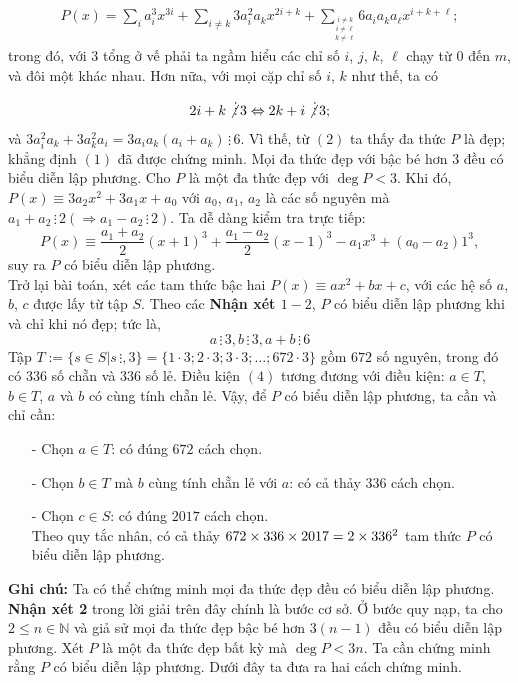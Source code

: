 \begin{bt}
{	\begin{align*}
	P(x)=\sum\limits_{i}a_{i}^{3}x^{3i}+\sum\limits_{i\neq k}3a_{i}^{2}a_{k}x^{2i+k}+\sum\limits_{\overset{i\neq k}{\overset{i\neq \ell}{\overset{k\neq \ell}{}}}}6a_{i}a_{k}a_{\ell}x^{i+k+\ell}; \tag{2}
	\end{align*} 
	trong đó, với $3$ tổng ở vế phải ta ngầm hiểu các chỉ số $i$, $j$, $k$, $\ell$ chạy từ $0$ đến $m$, và đôi một khác nhau. Hơn nữa, với mọi cặp chỉ số $i$, $k$ như thế, ta có 
	\begin{align*}
	2i+k\not\vdots\,3 \Leftrightarrow 2k+i\not\vdots\,3;
	\end{align*} và $3a_{i}^{2}a_{k}+3a_{k}^{2}a_{i}=3a_{i}a_{k}(a_{i}+a_{k})\,\vdots\,6$. Vì thế, từ $(2)$ ta thấy đa thức $P$ là đẹp; khẳng định $(1)$ đã được chứng minh.
	\nx Mọi đa thức đẹp với bậc bé hơn $3$ đều có biểu diễn lập phương.
	\cm Cho $P$ là một đa thức đẹp với $\deg P<3$. Khi đó, $P(x)\equiv 3a_{2}x^{2}+3a_{1}x+a_{0}$ với $a_{0}$, $a_{1}$, $a_{2}$ là các số nguyên mà $a_{1}+a_{2}\,\vdots\,2 (\Rightarrow a_{1}-a_{2}\,\vdots\,2)$. Ta dễ dàng kiểm tra trực tiếp:
		\[P(x)\equiv\dfrac{a_{1}+a_{2}}{2}(x+1)^{3}+\dfrac{a_{1}-a_{2}}{2}(x-1)^{3}-a_{1}x^{3}+(a_{0}-a_{2})1^{3},\tag{3}\] suy ra $P$ có biểu diễn lập phương.\\
	Trở lại bài toán, xét các tam thức bậc hai $P(x)\equiv ax^{2}+bx+c$, với các hệ số $a$, $b$, $c$ được lấy từ tập $S$. Theo các \textbf{Nhận xét $1-2$}, $P$ có biểu diễn lập phương khi và chỉ khi nó đẹp; tức là, 
	\[a\,\vdots\,3, b\,\vdots\,3, a+b \,\vdots\,6 \tag{4}\] 
	Tập $T:=\{s\in S|s\,\vdots,3\}=\{1\cdot3; 2\cdot3; 3\cdot3;\ldots;672\cdot3\}$ gồm $672$ số nguyên, trong đó có $336$ số chẵn và $336$ số lẻ. Điều kiện $(4)$ tương đương với điều kiện: $a\in T$, $b\in T$, $a$ và $b$ có cùng tính chẵn lẻ. Vậy, để $P$ có biểu diễn lập phương, ta cần và chỉ cần: 
	\begin{itemize} 
		\item[-] Chọn $a\in T$: có đúng $672$ cách chọn.
		\item[-] Chọn $b\in T$ mà $b$ cùng tính chẵn lẻ với $a$: có cả thảy $336$ cách chọn.
		\item[-] Chọn $c\in S$: có đúng $2017$ cách chọn.\\
		Theo quy tắc nhân, có cả thảy $672\times336\times2017=2\times336^{2}\time2017$ tam thức $P$ có biểu diễn lập phương.
	\end{itemize}
	\textbf{Ghi chú:} Ta có thể chứng minh mọi đa thức đẹp đều có biểu diễn lập phương. \textbf{Nhận xét 2} trong lời giải trên đây chính là bước cơ sở. Ở bước quy nạp, ta cho $2\leq n\in \mathbb{N}$ và giả sử mọi đa thức đẹp bậc bé hơn $3(n-1)$ đều có biểu diễn lập phương. Xét $P$ là một đa thức đẹp bất kỳ mà $\deg P<3n$. Ta cần chứng minh rằng $P$ có biểu diễn lập phương. Dưới đây ta đưa ra hai cách chứng minh.\\
}
\end{bt}
